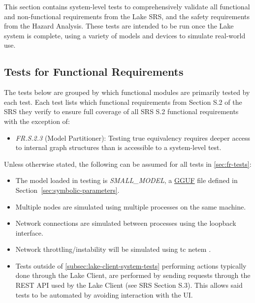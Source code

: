 \documentclass[12pt, titlepage]{article}
\providecommand{\glink}[2]{\hyperlink{gls:#1}{#2}}
\begin{document}
This section contains system-level tests to comprehensively validate all functional and non-functional
requirements from the Lake SRS, and the safety requirements from the Hazard Analysis. These tests are intended to be run once the Lake system is complete, using
a variety of models and devices to simulate real-world use.

\subsection{Tests for Functional Requirements}\label{sec:fr-tests}

The tests below are grouped by which functional modules are primarily tested
by each test. Each test lists which functional requirements from Section S.2 of the SRS
they verify to ensure full coverage of all SRS S.2 functional requirements with the exception of:
\begin{itemize}
	\item \textit{FR.S.2.3} (Model Partitioner): Testing true equivalency requires deeper access to internal graph structures
		than is accessible to a system-level test.
\end{itemize}

\vspace{5mm}

\noindent Unless otherwise stated, the following can be assumed for all tests in \autoref{sec:fr-tests}:
\begin{itemize}
	\item The model loaded in testing is \textit{SMALL\_MODEL}, a \glink{gguf}{GGUF} file defined in
		Section~\ref{sec:symbolic-parameters}.
	\item Multiple nodes are simulated using multiple processes on the same machine.
	\item Network connections are simulated between processes using the loopback interface.
	\item Network throttling/instability will be simulated using tc netem \citep{TcNetem}.
	\item Tests outside of \autoref{subsec:lake-client-system-tests} performing actions typically done through the Lake
		Client, are performed by sending requests through the REST API used by the Lake Client (see SRS Section
		S.3). This allows said tests to be automated by avoiding interaction with the UI.
\end{itemize}
\end{document}
